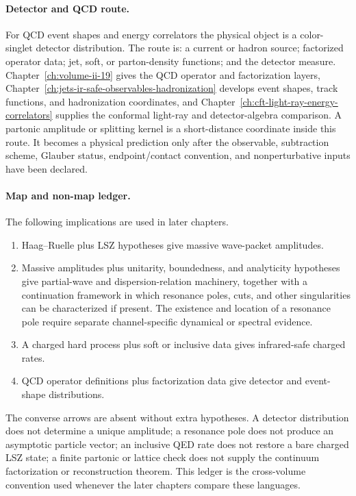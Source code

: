 \paragraph{Detector and QCD route.}
For QCD event shapes and energy correlators the physical object is a
color-singlet detector distribution.  The route is: a current or hadron
source; factorized operator data; jet, soft, or parton-density functions; and
the detector measure.
Chapter~\ref{ch:volume-ii-19} gives the QCD operator and factorization
layers, Chapter~\ref{ch:jets-ir-safe-observables-hadronization} develops
event shapes, track functions, and hadronization coordinates, and
Chapter~\ref{ch:cft-light-ray-energy-correlators} supplies the conformal
light-ray and detector-algebra comparison.  A partonic amplitude or splitting
kernel is a short-distance coordinate inside this route.  It becomes a
physical prediction only after the observable, subtraction scheme, Glauber
status, endpoint/contact convention, and nonperturbative inputs have been
declared.

\paragraph{Map and non-map ledger.}
The following implications are used in later chapters.
\begin{enumerate}
  \item Haag--Ruelle plus LSZ hypotheses give massive wave-packet amplitudes.
  \item Massive amplitudes plus unitarity, boundedness, and analyticity
  hypotheses give partial-wave and dispersion-relation machinery, together
  with a continuation framework in which resonance poles, cuts, and other
  singularities can be characterized if present.  The existence and location
  of a resonance pole require separate channel-specific dynamical or spectral
  evidence.
  \item A charged hard process plus soft or inclusive data gives
  infrared-safe charged rates.
  \item QCD operator definitions plus factorization data give detector and
  event-shape distributions.
\end{enumerate}
The converse arrows are absent without extra hypotheses.  A detector
distribution does not determine a unique amplitude; a resonance pole does not
produce an asymptotic particle vector; an inclusive QED rate does not restore
a bare charged LSZ state; a finite partonic or lattice check does not supply
the continuum factorization or reconstruction theorem.  This ledger is the
cross-volume convention used whenever the later chapters compare these
languages.

